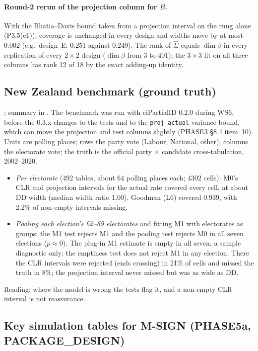 \paragraph{Round-2 rerun of the projection column for $B$.} With the Bhatia--Davis
bound taken from a projection interval on the rung alone (P3.5(c1)), coverage is
unchanged in every design and widths move by at most 0.002 (e.g.\ design~E: 0.251
against 0.249). The rank of $\hat\Sigma$ equals $\dim\beta$ in every replication of
every $2\times2$ design ($\dim\beta$ from 3 to 401); the $3\times3$ fit on all three
columns has rank 12 of 18 by the exact adding-up identity.

\subsection{New Zealand benchmark (ground truth)}

; summary in
. The benchmark was run with
eiPartialID 0.2.0 during WS6, before the 0.3.x changes to the tests and to the
\texttt{proj\_actual} variance bound, which can move the projection and test
columns slightly (PHASE3 \S8.4 item~10). Units are polling places;
rows the party vote (Labour, National, other); columns the electorate vote; the
truth is the official party $\times$ candidate cross-tabulation, 2002--2020.
\begin{itemize}[nosep]
\item \emph{Per electorate} (492 tables, about 64 polling places each; 4302 cells):
M0's CLR and projection intervals for the actual rate covered every cell, at about
DD width (median width ratio 1.00). Goodman (L6) covered 0.939, with 2.2\% of
non-empty intervals missing.
\item \emph{Pooling each election's 62--69 electorates} and fitting M1 with
electorates as groups: the M1 test rejects M1 and the pooling test rejects M0 in
all seven elections ($p\approx0$). The plug-in M1 estimate is empty in all seven,
a sample diagnostic only: the emptiness test does not reject M1 in any election. There the CLR intervals were rejected (ends
crossing) in 21\% of cells and missed the truth in 8\%; the projection interval
never missed but was as wide as DD.
\end{itemize}
Reading: where the model is wrong the tests flag it, and a non-empty CLR interval is
not reassurance.

\subsection{Key simulation tables for M-SIGN (PHASE5a, PACKAGE\_DESIGN)}

